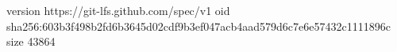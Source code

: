 version https://git-lfs.github.com/spec/v1
oid sha256:603b3f498b2fd6b3645d02cdf9b3ef047acb4aad579d6c7e6e57432c1111896c
size 43864
